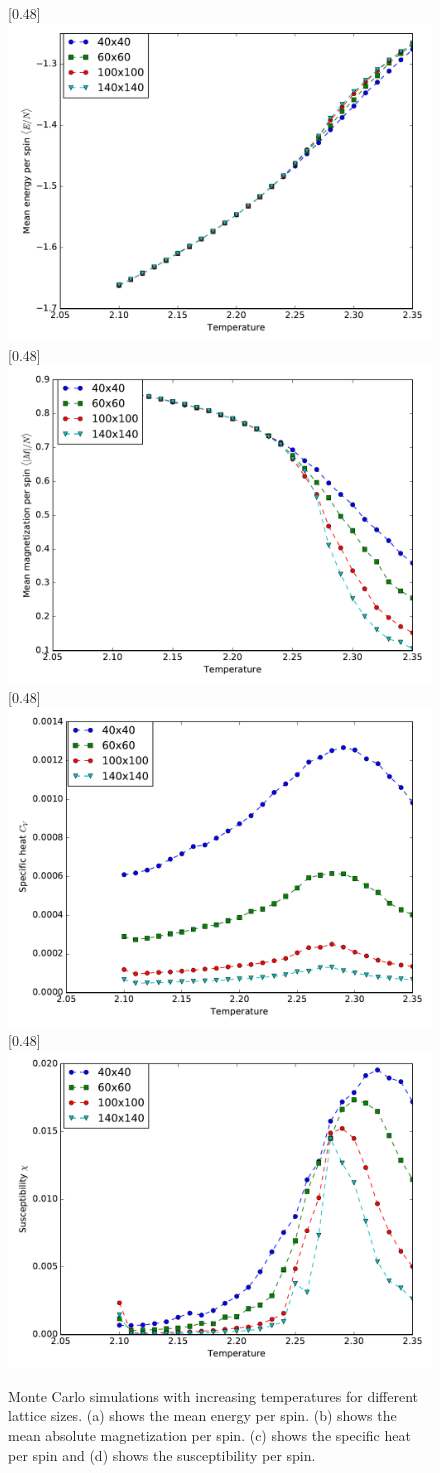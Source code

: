 \documentclass{article}
\begin{document}
\begin{figure}
\centering
{}[0.48\textwidth]{%
    \includegraphics[width=0.48\linewidth]{fig/mean_energy.pdf}
}
[0.48\textwidth]{%
    \includegraphics[width=0.48\linewidth]{fig/mean_abs_magnetization.pdf}
}
[0.48\textwidth]{%
    \includegraphics[width=0.48\linewidth]{fig/heat_capacity.pdf}
}
[0.48\textwidth]{%
    \includegraphics[width=0.48\linewidth]{fig/susceptibility.pdf}
}
\caption{Monte Carlo simulations with increasing temperatures for different lattice sizes. (a) shows the mean energy per spin. (b) shows the mean absolute magnetization per spin. (c) shows the specific heat per spin and (d) shows the susceptibility per spin.}
\label{fig:temp_simulation}
\end{figure}
\end{document}
